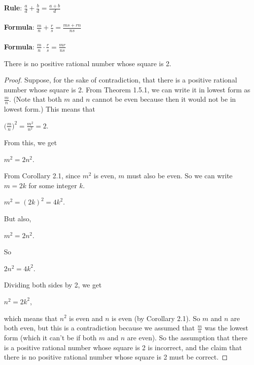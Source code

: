 \documentclass[12pt]{article}
\begin{document}
\textbf{Rule}: $\displaystyle \frac{a}{d}+\displaystyle \frac{b}{d}=\displaystyle \frac{a+b}{d}$ \\
\\
\textbf{Formula}: $\displaystyle \frac{m}{n}+\displaystyle \frac{r}{s}=\displaystyle \frac{ms+rn}{ns}$ \\
\\
\textbf{Formula}: $\displaystyle \frac{m}{n}\cdot \displaystyle \frac{r}{s}=\displaystyle \frac{mr}{ns}$
\begin{theorem}
There is no positive rational number whose square is 2.
\end{theorem}
\begin{proof}
Suppose, for the sake of contradiction, that there is a positive rational number whose square is 2. From Theorem 1.5.1, we can write it in lowest form as $\displaystyle \frac{m}{n}$. (Note that both $m$ and $n$ cannot be even because then it would not be in lowest form.) This means that
\begin{center}
$\displaystyle \bigg(\frac{m}{n}\bigg)^2=\displaystyle \frac{m^2}{n^2}=2$.
\end{center}
From this, we get
\begin{center}
$m^2=2n^2$.
\end{center}
From Corollary 2.1, since $m^2$ is even, $m$ must also be even. So we can write $m=2k$ for some integer $k$.
\begin{center}
$m^2=(2k)^2=4k^2$.
\end{center}
But also,
\begin{center}
$m^2=2n^2$.
\end{center}
So \begin{center}
$2n^2=4k^2$.
\end{center}
Dividing both sides by 2, we get
\begin{center}
$n^2=2k^2$,
\end{center}
which means that $n^2$ is even and $n$ is even (by Corollary 2.1). So $m$ and $n$ are both even, but this is a contradiction because we assumed that $\displaystyle \frac{m}{n}$ was the lowest form (which it can't be if both $m$ and $n$ are even). So the assumption that there is a positive rational number whose square is 2 is incorrect, and the claim that there is no positive rational number whose square is 2 must be correct.
\end{proof}
\end{document}
